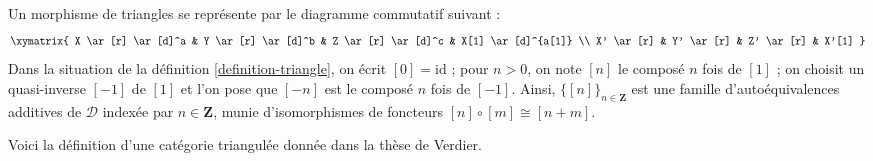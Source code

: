 \noindent
Un morphisme de triangles se représente par le diagramme commutatif suivant :
$$
\xymatrix{
X \ar[r] \ar[d]^a &
Y \ar[r] \ar[d]^b &
Z \ar[r] \ar[d]^c &
X[1] \ar[d]^{a[1]} \\
X' \ar[r] &
Y' \ar[r] &
Z' \ar[r] &
X'[1]
}
$$
Dans la situation de la définition \ref{definition-triangle}, on écrit
$[0] = \text{id}$ ; pour $n > 0$, on note $[n]$ le composé $n$ fois de
$[1]$ ; on choisit un quasi-inverse $[-1]$ de $[1]$ et l'on pose que $[-n]$
est le composé $n$ fois de $[-1]$. Ainsi, $\{[n]\}_{n \in \mathbf{Z}}$
est une famille d'autoéquivalences additives de $\mathcal{D}$ indexée par
$n \in \mathbf{Z}$, munie d'isomorphismes de foncteurs
$[n] \circ [m] \cong [n + m]$.

\medskip\noindent
Voici la définition d'une catégorie triangulée donnée dans la thèse de Verdier.

